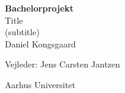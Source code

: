 \begin{titlingpage}
  \centering
  {\Huge\bfseries Bachelorprojekt} \\[2.5em]
  {\Huge Title} \\[1.5em]
  {\huge (subtitle)} \\[2.5em]
  {\huge Daniel Kongsgaard}
  \vfill
  
  {\huge Vejleder: Jens Carsten Jantzen}
  \vfill

  {\Large Aarhus Universitet}
\end{titlingpage}
